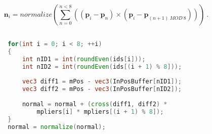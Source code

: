 		\begin{equation}
		\mathbf{n}_{i} = normalize( \sum_{n = 0}^{n < 8} ( (\mathbf{p}_{i} - \mathbf{p}_{n}) \times (\mathbf{p}_{i} - \mathbf{p}_{(n+1)\ MOD\ 8}) ) ) \ .
		\end{equation}
		\newpage
		
		\begin{lstlisting}[language=GLSL]
		
		for(int i = 0; i < 8; ++i)
		{
			int nID1 = int(roundEven(ids[i]));
			int nID2 = int(roundEven(ids[(i + 1) % 8]));
			
			vec3 diff1 = mPos - vec3(InPosBuffer[nID1]);
			vec3 diff2 = mPos - vec3(InPosBuffer[nID2]);
			
			normal = normal + (cross(diff1, diff2) * 
				mpliers[i] * mpliers[(i + 1) % 8]);
		}
		normal = normalize(normal);
		
		\end{lstlisting}
		
	
